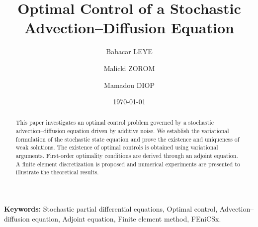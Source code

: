 \documentclass[11pt,a4paper]{article}
\title{
Optimal Control of a Stochastic Advection--Diffusion Equation
}
\author{
Babacar LEYE \and
Malicki ZOROM \and
Mamadou DIOP
}
\date{\today}
\theoremstyle{definition}
\begin{document}

\maketitle

\begin{abstract}

This paper investigates an optimal control problem governed by a stochastic advection--diffusion equation driven by additive noise. We establish the variational formulation of the stochastic state equation and prove the existence and uniqueness of weak solutions. The existence of optimal controls is obtained using variational arguments. First-order optimality conditions are derived through an adjoint equation. A finite element discretization is proposed and numerical experiments are presented to illustrate the theoretical results.

\end{abstract}

\textbf{Keywords:}
Stochastic partial differential equations,
Optimal control,
Advection--diffusion equation,
Adjoint equation,
Finite element method,
FEniCSx.

\bigskip

\tableofcontents

\newpage


























\end{document}
